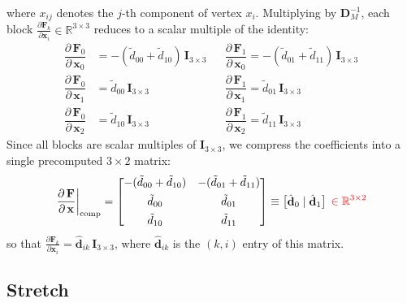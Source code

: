 \documentclass{article}
\newcommand{\pd}[2]{\dfrac{\partial\, #1}{\partial\, #2}}
\newcommand{\drop}[1]{\textcolor{red}{#1}}
\begin{document}
where $x_{ij}$ denotes the $j$-th component of vertex $x_i$.
Multiplying by $\mathbf{D}_M^{-1}$, each block 
$\frac{\partial \mathbf{F}_k}{\partial \mathbf{x}_i} \in \mathbb{R}^{3\times3}$ 
reduces to a scalar multiple of the identity:
\begin{align*}
    \pd{\mathbf{F}_0}{\mathbf{x}_0} &= 
        -(\tilde{d}_{00} + \tilde{d}_{10})\, \mathbf{I}_{3 \times 3} &&
    \pd{\mathbf{F}_1}{\mathbf{x}_0}  = 
        -(\tilde{d}_{01} + \tilde{d}_{11})\, \mathbf{I}_{3 \times 3} \\[2ex]
    \pd{\mathbf{F}_0}{\mathbf{x}_1} &= \tilde{d}_{00}\, \mathbf{I}_{3 \times 3} &&
    \pd{\mathbf{F}_1}{\mathbf{x}_1}  = \tilde{d}_{01}\, \mathbf{I}_{3 \times 3} \\[2ex]
    \pd{\mathbf{F}_0}{\mathbf{x}_2} &= \tilde{d}_{10}\, \mathbf{I}_{3 \times 3} &&
    \pd{\mathbf{F}_1}{\mathbf{x}_2}  = \tilde{d}_{11}\, \mathbf{I}_{3 \times 3}
\end{align*}
Since all blocks are scalar multiples of $\mathbf{I}_{3 \times 3}$, we compress the coefficients into a single precomputed $3\times 2$ matrix:
\begin{equation}
\label{eq:dF_dx}
\left.\pd{\mathbf{F}}{\mathbf{x}}\right|_{\text{comp}} = 
\begin{bmatrix}
    -(\tilde{d}_{00} + \tilde{d}_{10})  & -(\tilde{d}_{01} + \tilde{d}_{11}) \\[1ex]
    \tilde{d}_{00}                      & \tilde{d}_{01}                      \\[1ex]
    \tilde{d}_{10}                      & \tilde{d}_{11}                
\end{bmatrix} \equiv
\begin{bmatrix} \hat{\mathbf{d}}_0 \mid \hat{\mathbf{d}}_1\end{bmatrix}
\;\drop{\in \mathbb{R}^{3\times 2}}
\end{equation}
so that $\frac{\partial \mathbf{F}_k}{\partial \mathbf{x}_i} = \hat{\mathbf{d}}_{ik}\,\mathbf{I}_{3 \times 3}$, where $\hat{\mathbf{d}}_{ik}$ is the $(k,i)$ entry of this matrix.

\subsection{Stretch}
\end{document}
